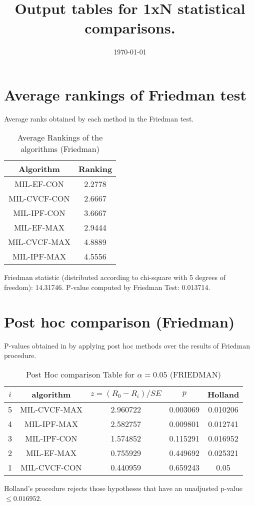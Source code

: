 \documentclass[a4paper,10pt]{article}
\title{Output tables for 1xN statistical comparisons.}
\author{}
\date{\today}
\begin{document}
\begin{landscape}
\pagestyle{empty}
\maketitle
\thispagestyle{empty}

\section{Average rankings of Friedman test}


Average ranks obtained by each method in the Friedman test.

\begin{table}[!htp]
\centering
\begin{tabular}{|c|c|}\hline
Algorithm&Ranking\\\hline
MIL-EF-CON&2.2778\\MIL-CVCF-CON&2.6667\\MIL-IPF-CON&3.6667\\MIL-EF-MAX&2.9444\\MIL-CVCF-MAX&4.8889\\MIL-IPF-MAX&4.5556\\\hline\end{tabular}
\caption{Average Rankings of the algorithms (Friedman)}
\end{table}

Friedman statistic (distributed according to chi-square with 5 degrees of freedom): 14.31746. \newline P-value computed by Friedman Test: 0.013714.\newline


\newpage

\section{Post hoc comparison (Friedman)}


P-values obtained in by applying post hoc methods over the results of Friedman procedure.

\begin{table}[!htp]
\centering\footnotesize
\begin{tabular}{ccccc}
$i$&algorithm&$z=(R_0 - R_i)/SE$&$p$&Holland\\
\hline5&MIL-CVCF-MAX&2.960722&0.003069&0.010206\\4&MIL-IPF-MAX&2.582757&0.009801&0.012741\\3&MIL-IPF-CON&1.574852&0.115291&0.016952\\2&MIL-EF-MAX&0.755929&0.449692&0.025321\\1&MIL-CVCF-CON&0.440959&0.659243&0.05\\\hline
\end{tabular}
\caption{Post Hoc comparison Table for $\alpha=0.05$ (FRIEDMAN)}
\end{table}Holland's procedure rejects those hypotheses that have an unadjusted p-value $\le0.016952$.



\end{landscape}
\end{document}
